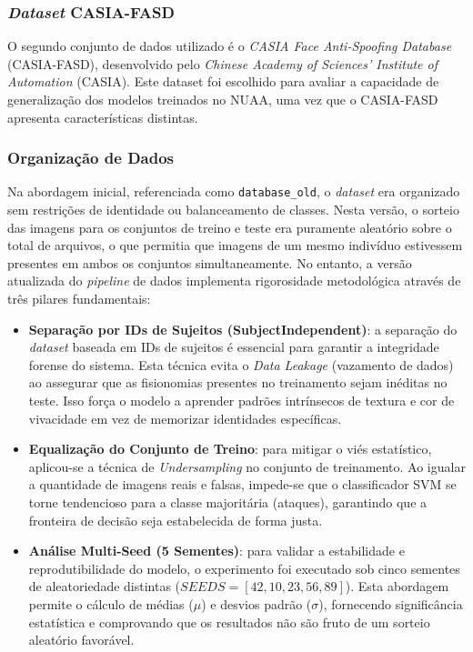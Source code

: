 \documentclass[
	article,			%
	11pt,				%
	oneside,			%
	a4paper,			%
	english,			%
	brazil,				%
	sumario=tradicional
	]{abntex2}
\begin{document}
\subsubsection{\textit{Dataset} CASIA-FASD}
O segundo conjunto de dados utilizado é o \textit{CASIA Face Anti-Spoofing Database} (CASIA-FASD), desenvolvido pelo \textit{Chinese Academy of Sciences' Institute of Automation} (CASIA). Este dataset foi escolhido para avaliar a capacidade de generalização dos modelos treinados no NUAA, uma vez que o CASIA-FASD apresenta características distintas.

\subsubsection{Organização de Dados}
Na abordagem inicial, referenciada como \texttt{database\_old}, o \textit{dataset} era organizado sem restrições de identidade ou balanceamento de classes. Nesta versão, o sorteio das imagens para os conjuntos de treino e teste era puramente aleatório sobre o total de arquivos, o que permitia que imagens de um mesmo indivíduo estivessem presentes em ambos os conjuntos simultaneamente. No entanto, a versão atualizada do \textit{pipeline} de dados implementa rigorosidade metodológica através de três pilares fundamentais:

\begin{itemize}
  \item \textbf{Separação por IDs de Sujeitos (Subject\-Independent)}: a separação do \textit{dataset} baseada em IDs de sujeitos é essencial para garantir a integridade forense do sistema. Esta técnica evita o \textit{Data Leakage} (vazamento de dados) ao assegurar que as fisionomias presentes no treinamento sejam inéditas no teste. Isso força o modelo a aprender padrões intrínsecos de textura e cor de vivacidade em vez de memorizar identidades específicas.
  \item \textbf{Equalização do Conjunto de Treino}: para mitigar o viés estatístico, aplicou-se a técnica de \textit{Undersampling} no conjunto de treinamento. Ao igualar a quantidade de imagens reais e falsas, impede-se que o classificador SVM se torne tendencioso para a classe majoritária (ataques), garantindo que a fronteira de decisão seja estabelecida de forma justa.
  \item \textbf{Análise Multi-Seed (5 Sementes)}: para validar a estabilidade e reprodutibilidade do modelo, o experimento foi executado sob cinco sementes de aleatoriedade distintas (\(SEEDS = [42, 10, 23, 56, 89]\)). Esta abordagem permite o cálculo de médias (\(\mu\)) e desvios padrão (\(\sigma\)), fornecendo significância estatística e comprovando que os resultados não são fruto de um sorteio aleatório favorável.
\end{itemize}
\end{document}
